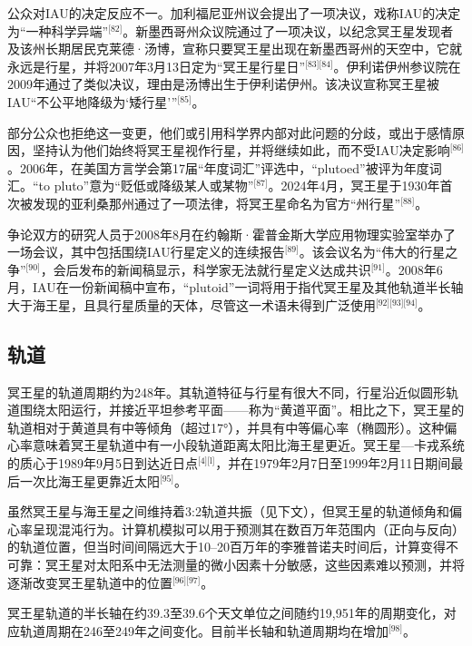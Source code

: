 公众对IAU的决定反应不一。加利福尼亚州议会提出了一项决议，戏称IAU的决定为“一种科学异端”\(^\text{[82]}\)。新墨西哥州众议院通过了一项决议，以纪念冥王星发现者及该州长期居民克莱德·汤博，宣称只要冥王星出现在新墨西哥州的天空中，它就永远是行星，并将2007年3月13日定为“冥王星行星日”\(^\text{[83][84]}\)。伊利诺伊州参议院在2009年通过了类似决议，理由是汤博出生于伊利诺伊州。该决议宣称冥王星被IAU“不公平地降级为‘矮行星’”\(^\text{[85]}\)。

部分公众也拒绝这一变更，他们或引用科学界内部对此问题的分歧，或出于感情原因，坚持认为他们始终将冥王星视作行星，并将继续如此，而不受IAU决定影响\(^\text{[86]}\)。2006年，在美国方言学会第17届“年度词汇”评选中，“plutoed”被评为年度词汇。“to pluto”意为“贬低或降级某人或某物”\(^\text{[87]}\)。2024年4月，冥王星于1930年首次被发现的亚利桑那州通过了一项法律，将冥王星命名为官方“州行星”\(^\text{[88]}\)。

争论双方的研究人员于2008年8月在约翰斯·霍普金斯大学应用物理实验室举办了一场会议，其中包括围绕IAU行星定义的连续报告\(^\text{[89]}\)。该会议名为“伟大的行星之争”\(^\text{[90]}\)，会后发布的新闻稿显示，科学家无法就行星定义达成共识\(^\text{[91]}\)。2008年6月，IAU在一份新闻稿中宣布，“plutoid”一词将用于指代冥王星及其他轨道半长轴大于海王星，且具行星质量的天体，尽管这一术语未得到广泛使用\(^\text{[92][93][94]}\)。
\subsection{轨道}
冥王星的轨道周期约为248年。其轨道特征与行星有很大不同，行星沿近似圆形轨道围绕太阳运行，并接近平坦参考平面——称为“黄道平面”。相比之下，冥王星的轨道相对于黄道具有中等倾角（超过17°），并具有中等偏心率（椭圆形）。这种偏心率意味着冥王星轨道中有一小段轨道距离太阳比海王星更近。冥王星—卡戎系统的质心于1989年9月5日到达近日点\(^\text{[4][l]}\)，并在1979年2月7日至1999年2月11日期间最后一次比海王星更靠近太阳\(^\text{[95]}\)。

虽然冥王星与海王星之间维持着3:2轨道共振（见下文），但冥王星的轨道倾角和偏心率呈现混沌行为。计算机模拟可以用于预测其在数百万年范围内（正向与反向）的轨道位置，但当时间间隔远大于10–20百万年的李雅普诺夫时间后，计算变得不可靠：冥王星对太阳系中无法测量的微小因素十分敏感，这些因素难以预测，并将逐渐改变冥王星轨道中的位置\(^\text{[96][97]}\)。

冥王星轨道的半长轴在约39.3至39.6个天文单位之间随约19{,}951年的周期变化，对应轨道周期在246至249年之间变化。目前半长轴和轨道周期均在增加\(^\text{[98]}\)。
